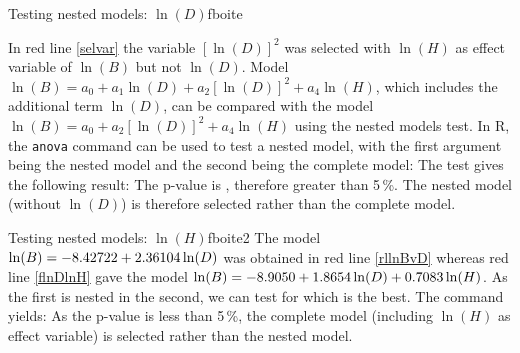 \begin{filrouge}{Testing nested models: $\ln(D)$}{fboite}%

In red line \ref{selvar} the variable $[\ln(D)]^2$ was selected with $\ln(H)$ as effect variable of $\ln(B)$ but not $\ln(D)$. Model $\ln(B)=a_0+a_1\ln(D)+a_2[\ln(D)]^2+a_4\ln(H)$, which includes the additional term $\ln(D)$, can be compared with the model $\ln(B)=a_0+a_2[\ln(D)]^2+a_4\ln(H)$ using the nested models test. In R, the \texttt{anova} command can be used to test a nested model, with the first argument being the nested model and the second being the complete model:
%
The test gives the following result:
%
The p-value is  , therefore greater than 5\,\%. The nested model (without $\ln(D)$) is therefore selected rather than the complete model.
\end{filrouge}

\begin{filrouge}{Testing nested models: $\ln(H)$}{fboite2}%
The model $\ln(B)=-\mbox{8.42722}+\mbox{2.36104}\ln(D)$ was obtained in red line \ref{rllnBvD} whereas red line \ref{flnDlnH} gave the model $\ln(B)=-\mbox{8.9050}+\mbox{1.8654}\ln(D)+\mbox{0.7083}\ln(H)$. As the first is nested in the second, we can test for which is the best. The command 
%
yields:
%
As the p-value is less than 5\,\%, the complete model (including $\ln(H)$ as effect variable) is selected rather than the nested model.

\end{filrouge}

